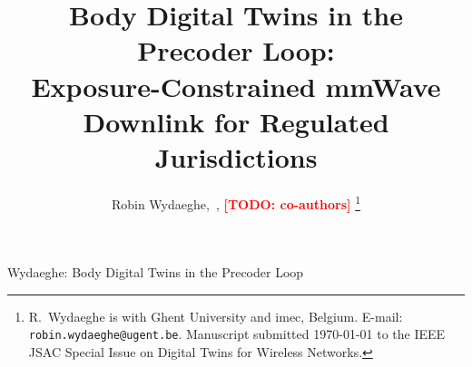\documentclass[journal,twoside,onecolumn]{IEEEtran}
\theoremstyle{definition}
\newcommand{\TODO}[1]{\textcolor{red}{\textbf{[TODO: #1]}}}
\begin{document}
\title{Body Digital Twins in the Precoder Loop: \\
       Exposure-Constrained mmWave Downlink for Regulated Jurisdictions}

\author{Robin Wydaeghe,~,
        \TODO{co-authors}
\thanks{R.~Wydaeghe is with Ghent University and imec, Belgium.
        E-mail: \texttt{robin.wydaeghe@ugent.be}. Manuscript submitted
        \today{} to the IEEE JSAC Special Issue on Digital Twins for
        Wireless Networks.}}

%
{Wydaeghe: Body Digital Twins in the Precoder Loop}

\maketitle
\end{document}
